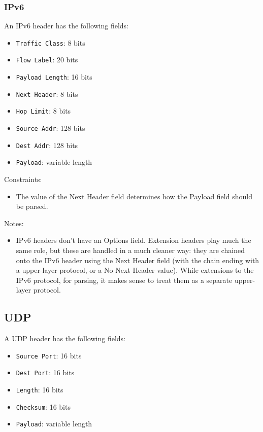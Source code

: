 \documentclass[10pt,a4paper]{article}
\begin{document}
\subsubsection{IPv6}

An IPv6 header has the following fields:
\begin{itemize}
\item \texttt{Traffic Class}: 8 bits
\item \texttt{Flow Label}: 20 bits
\item \texttt{Payload Length}: 16 bits
\item \texttt{Next Header}: 8 bits
\item \texttt{Hop Limit}: 8 bits
\item \texttt{Source Addr}: 128 bits
\item \texttt{Dest Addr}: 128 bits
\item \texttt{Payload}: variable length
\end{itemize}

Constraints:
\begin{itemize}
\item The value of the Next Header field determines how the Payload field should be parsed.
\end{itemize}

Notes:
\begin{itemize}
\item IPv6 headers don't have an Options field. Extension headers play much the same role,
but these are handled in a much cleaner way: they are chained onto the IPv6 header using
the Next Header field (with the chain ending with a upper-layer protocol, or a No Next
Header value). While extensions to the IPv6 protocol, for parsing, it makes sense to treat
them as a separate upper-layer protocol.
\end{itemize}

\subsection{UDP}

A UDP header has the following fields:
\begin{itemize}
\item \texttt{Source Port}: 16 bits
\item \texttt{Dest Port}: 16 bits
\item \texttt{Length}: 16 bits
\item \texttt{Checksum}: 16 bits
\item \texttt{Payload}: variable length
\end{itemize}
\end{document}
